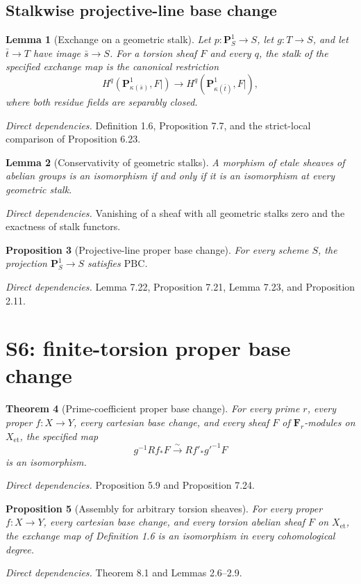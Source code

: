 \documentclass[10pt]{article}
\newtheorem{theorem}{Theorem}[section]
\newtheorem{proposition}[theorem]{Proposition}
\newtheorem{lemma}[theorem]{Lemma}
\theoremstyle{definition}
\newcommand{\F}{\mathbf F}
\newcommand{\Et}{\mathrm{et}}
\newcommand{\deps}[1]{\par\smallskip\textit{Direct dependencies.} #1\par}
\begin{document}
\subsection{Stalkwise projective-line base change}

\begin{lemma}[Exchange on a geometric stalk]
Let $p:\mathbf P^1_S\to S$, let $g:T\to S$, and let $\bar t\to T$ have
image $\bar s\to S$.  For a torsion sheaf $F$ and every $q$, the stalk of
the specified exchange map is the canonical restriction
\[
 H^q(\mathbf P^1_{\kappa(\bar s)},F|)
 \longrightarrow
 H^q(\mathbf P^1_{\kappa(\bar t)},F|),
\]
where both residue fields are separably closed.
\end{lemma}
\deps{Definition 1.6, Proposition 7.7, and the strict-local comparison of
Proposition 6.23.}

\begin{lemma}[Conservativity of geometric stalks]
A morphism of etale sheaves of abelian groups is an isomorphism if and only
if it is an isomorphism at every geometric stalk.
\end{lemma}
\deps{Vanishing of a sheaf with all geometric stalks zero and the exactness
of stalk functors.}

\begin{proposition}[Projective-line proper base change]
For every scheme $S$, the projection
$\mathbf P^1_S\to S$ satisfies $\mathrm{PBC}$.
\end{proposition}
\deps{Lemma 7.22, Proposition 7.21, Lemma 7.23, and Proposition 2.11.}

\section{S6: finite-torsion proper base change}

\begin{theorem}[Prime-coefficient proper base change]
For every prime $r$, every proper $f:X\to Y$, every cartesian base change,
and every sheaf $F$ of $\F_r$-modules on $X_{\Et}$, the specified map
\[
 g^{-1}Rf_*F\xrightarrow{\sim}Rf'_*g'^{-1}F
\]
is an isomorphism.
\end{theorem}
\deps{Proposition 5.9 and Proposition 7.24.}

\begin{proposition}[Assembly for arbitrary torsion sheaves]
For every proper $f:X\to Y$, every cartesian base change, and every torsion
abelian sheaf $F$ on $X_{\Et}$, the exchange map of Definition 1.6 is an
isomorphism in every cohomological degree.
\end{proposition}
\deps{Theorem 8.1 and Lemmas 2.6--2.9.}
\end{document}
